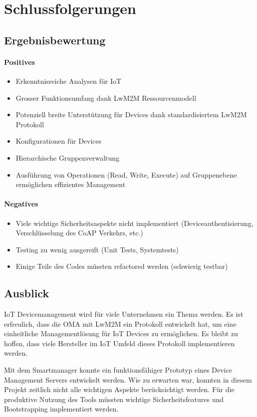 \chapter{Schlussfolgerungen}
\section{Ergebnisbewertung}
\subsubsection{Positives}
\begin{itemize}
\item Erkenntnisreiche Analysen für IoT
\item Grosser Funktionsumfang dank LwM2M Ressourcenmodell
\item Potenziell breite Unterstützung für Devices dank standardisiertem LwM2M Protokoll
\item Konfigurationen für Devices
\item Hierarchische Gruppenverwaltung
\item Ausführung von Operationen (Read, Write, Execute) auf Gruppenebene ermöglichen effizientes Management
\end{itemize}

\subsubsection{Negatives}
\begin{itemize}
\item Viele wichtige Sicherheitsaspekte nicht implementiert (Deviceauthentisierung, Verschlüsselung des CoAP Verkehrs, etc.)
\item Testing zu wenig ausgereift (Unit Tests, Systemtests)
\item Einige Teile des Codes müssten refactored werden (schwierig testbar)
\end{itemize}

\section{Ausblick}
IoT Devicemanagement wird für viele Unternehmen ein Thema werden. Es ist erfreulich, dass die OMA mit LwM2M ein Protokoll entwickelt hat, um eine einheitliche Managementlösung für IoT Devices zu ermöglichen. Es bleibt zu hoffen, dass viele Hersteller im IoT Umfeld dieses Protokoll implementieren werden.

Mit dem Smartmanager konnte ein funktionsfähiger Prototyp eines Device Management Servers entwickelt werden. Wie zu erwarten war, konnten in diesem Projekt zeitlich nicht alle wichtigen Aspekte berücksichtigt werden. Für die produktive Nutzung des Tools müssten wichtige Sicherheitsfeatures und Bootstrapping implementiert werden.


